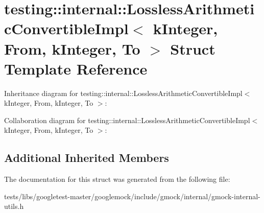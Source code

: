 \hypertarget{structtesting_1_1internal_1_1LosslessArithmeticConvertibleImpl_3_01kInteger_00_01From_00_01kInteger_00_01To_01_4}{}\section{testing\+:\+:internal\+:\+:Lossless\+Arithmetic\+Convertible\+Impl$<$ k\+Integer, From, k\+Integer, To $>$ Struct Template Reference}
\label{structtesting_1_1internal_1_1LosslessArithmeticConvertibleImpl_3_01kInteger_00_01From_00_01kInteger_00_01To_01_4}


Inheritance diagram for testing\+:\+:internal\+:\+:Lossless\+Arithmetic\+Convertible\+Impl$<$ k\+Integer, From, k\+Integer, To $>$\+:


Collaboration diagram for testing\+:\+:internal\+:\+:Lossless\+Arithmetic\+Convertible\+Impl$<$ k\+Integer, From, k\+Integer, To $>$\+:
\subsection*{Additional Inherited Members}


The documentation for this struct was generated from the following file\+:\begin{DoxyCompactItemize}
\item 
tests/libs/googletest-\/master/googlemock/include/gmock/internal/gmock-\/internal-\/utils.\+h\end{DoxyCompactItemize}
